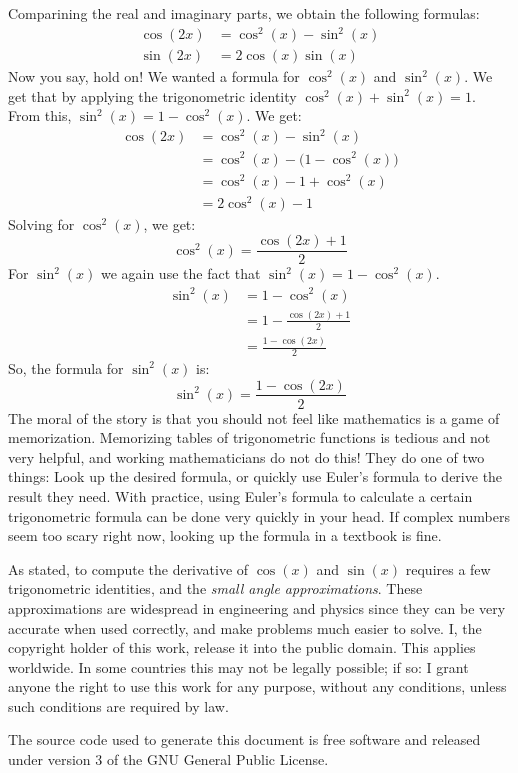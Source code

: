 \documentclass{article}
\theoremstyle{normal}
\theoremstyle{plain}
\begin{document}
    Comparining the real and imaginary parts, we obtain the following formulas:
    \begin{align}
        \cos(2x)&=\cos^{2}(x)-\sin^{2}(x)\\
        \sin(2x)&=2\cos(x)\sin(x)
    \end{align}
    Now you say, hold on! We wanted a formula for $\cos^{2}(x)$ and
    $\sin^{2}(x)$. We get that by applying the trigonometric identity
    $\cos^{2}(x)+\sin^{2}(x)=1$. From this, $\sin^{2}(x)=1-\cos^{2}(x)$. We get:
    \begin{align}
        \cos(2x)&=\cos^{2}(x)-\sin^{2}(x)\\
            &=\cos^{2}(x)-\big(1-\cos^{2}(x)\big)\\
            &=\cos^{2}(x)-1+\cos^{2}(x)\\
            &=2\cos^{2}(x)-1
    \end{align}
    Solving for $\cos^{2}(x)$, we get:
    \begin{equation}
        \cos^{2}(x)=\frac{\cos(2x)+1}{2}
    \end{equation}
    For $\sin^{2}(x)$ we again use the fact that $\sin^{2}(x)=1-\cos^{2}(x)$.
    \begin{align}
        \sin^{2}(x)&=1-\cos^{2}(x)\\
            &=1-\frac{\cos(2x)+1}{2}\\
            &=\frac{1-\cos(2x)}{2}
    \end{align}
    So, the formula for $\sin^{2}(x)$ is:
    \begin{equation}
        \sin^{2}(x)=\frac{1-\cos(2x)}{2}
    \end{equation}
    The moral of the story is that you should not feel like mathematics is a
    game of memorization. Memorizing tables of trigonometric functions is
    tedious and not very helpful, and working mathematicians do not do this!
    They do one of two things: Look up the desired formula, or quickly use
    Euler's formula to derive the result they need. With practice, using
    Euler's formula to calculate a certain trigonometric formula can be done
    very quickly in your head. If complex numbers seem too scary right now,
    looking up the formula in a textbook is fine.
    \par\hfill\par
    As stated, to compute the derivative of $\cos(x)$ and $\sin(x)$ requires
    a few trigonometric identities, and the
    \textit{small angle approximations}. These approximations are widespread in
    engineering and physics since they can be very accurate when used correctly,
    and make problems much easier to solve.
    \newpage
    I, the copyright holder of this work, release it into the public domain.
    This applies worldwide. In some countries this may not be legally possible;
    if so: I grant anyone the right to use this work for any purpose, without
    any conditions, unless such conditions are required by law.
    \par\hfill\par
    The source code used to generate this document is free software and released
    under version 3 of the GNU General Public License.
\end{document}
